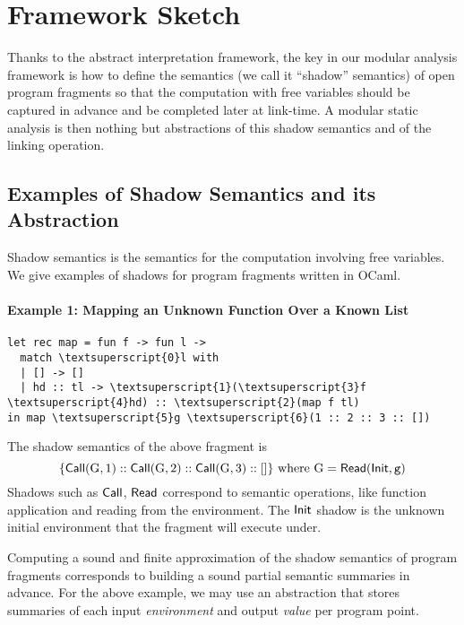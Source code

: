 \documentclass{article}
\begin{document}
\section{Framework Sketch}
Thanks to the abstract interpretation framework, the key in our
modular analysis framework is how to define the semantics (we call it
``shadow'' semantics) of open program fragments so that the
computation with free variables should be captured in advance
and be completed later at link-time. A modular static analysis is
then nothing but abstractions of this shadow semantics and of the
linking operation.

\subsection{Examples of Shadow Semantics and its Abstraction}
Shadow semantics is the semantics for the computation involving
free variables. We give examples of shadows for program fragments
written in OCaml.

\paragraph{Example 1: Mapping an Unknown Function Over a Known List}
\begin{center}
  \begin{BVerbatim}[commandchars=\\\{\}]
let rec map = fun f -> fun l ->
  match \textsuperscript{0}l with
  | [] -> []
  | hd :: tl -> \textsuperscript{1}(\textsuperscript{3}f \textsuperscript{4}hd) :: \textsuperscript{2}(map f tl)
in map \textsuperscript{5}g \textsuperscript{6}(1 :: 2 :: 3 :: [])
  \end{BVerbatim}
\end{center}
The shadow semantics of the above fragment is
\[
  \{\mathsf{Call}(\text{G},1)::\mathsf{Call}(\text{G},2)::\mathsf{Call}(\text{G},3)::[]\}
  \text{ where }
  \text{G}=\mathsf{Read}(\mathsf{Init},\texttt{g})
\]
Shadows such as $\mathsf{Call}$, $\mathsf{Read}$ correspond to semantic operations,
like function application and reading from the environment.
The $\mathsf{Init}$ shadow is the unknown initial environment that the fragment will execute under.

Computing a sound and finite approximation of the shadow
semantics of program fragments corresponds to building a sound partial
semantic summaries in advance. For the above example,
we may use an abstraction that stores summaries of each input \emph{environment}
and output \emph{value} per program point.
\end{document}
